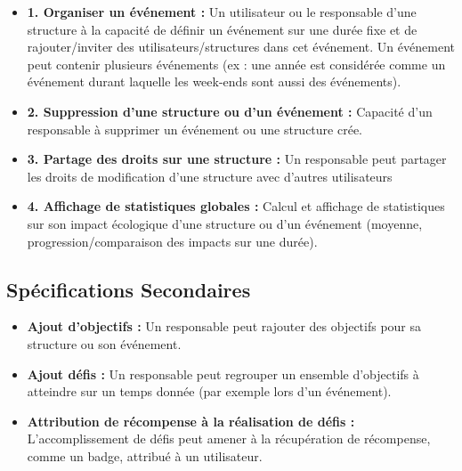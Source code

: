 \begin{itemize}
    \item \textbf{1. Organiser un événement :} Un utilisateur ou le responsable d'une structure à la capacité de définir un événement sur une durée fixe et de rajouter/inviter des utilisateurs/structures dans cet événement. Un événement peut contenir plusieurs événements (ex : une année est considérée comme un événement durant laquelle les week-ends sont aussi des événements).
    \item \textbf{2. Suppression d'une structure ou d'un événement :} Capacité d'un responsable à supprimer un événement ou une structure crée.
    \item \textbf{3. Partage des droits sur une structure :} Un responsable peut partager les droits de modification d'une structure avec d'autres utilisateurs
    \item \textbf{4. Affichage de statistiques globales :} Calcul et affichage de statistiques sur son impact écologique d'une structure ou d'un événement (moyenne, progression/comparaison des impacts sur une durée). 
\end{itemize}

\subsection{Spécifications Secondaires}
\begin{itemize}
    \item \textbf{Ajout d'objectifs :} Un responsable peut rajouter des objectifs pour sa structure ou son événement.
    \item \textbf{Ajout défis :} Un responsable peut regrouper un ensemble d'objectifs à atteindre sur un temps donnée (par exemple lors d'un événement). 
    \item \textbf{Attribution de récompense à la réalisation de défis :} L'accomplissement de défis peut amener à la récupération de récompense, comme un badge, attribué à un utilisateur. 
\end{itemize}

